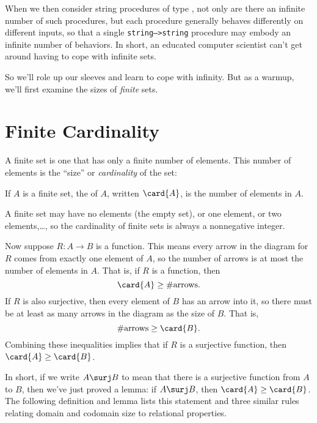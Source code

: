 When we then consider string procedures of
type , not only are there an infinite number
of such procedures, but each procedure generally behaves differently on
different inputs, so that a single \texttt{string-->string} procedure may
embody an infinite number of behaviors.  In short, an educated computer
scientist can't get around having to cope with infinite sets.
\fi

So we'll role up our sleeves and learn to cope with infinity.  But as
a warmup, we'll first examine the sizes of \emph{finite} sets.

\section{Finite Cardinality}\label{mappingrule_sec}

A finite set is one that has only a finite number of elements.  This
number of elements is the ``size'' or \emph{cardinality} of the set:
\begin{definition}\label{fin_card_def}
If $A$ is a finite set, the  of $A$, written $\card{A}$,
is the number of elements in $A$.
\end{definition}
A finite set may have no elements (the empty set), or one element, or two
elements,\dots, so the cardinality of finite sets is always a nonnegative
integer.

Now suppose $R:A \to B$ is a function.  This means every arrow in the diagram
for $R$ comes from exactly one element of $A$, so the number of arrows is
at most the number of elements in $A$.  That is, if $R$ is a function,
then
\[
\card{A} \geq \#\text{arrows}.
\]
If $R$ is also surjective, then every element of $B$ has an arrow
into it, so there must be at least as many arrows in the diagram as the
size of $B$.  That is,
\[
\#\text{arrows} \geq \card{B}.
\]
Combining these inequalities implies that if $R$ is a surjective
function, then $\card{A} \geq \card{B}$.

In short, if we write $A \surj B$ to mean that there is a surjective
function from $A$ to $B$, then we've just proved a lemma: if $A \surj B$,
then $\card{A} \geq \card{B}$.  The following definition and lemma lists
this statement and three similar rules relating domain and codomain size
to relational properties.

